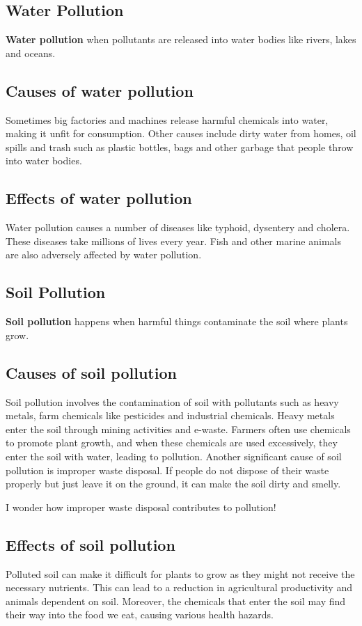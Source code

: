 \subsection{Water Pollution}
\textbf{Water pollution} when pollutants are released into water bodies like rivers, lakes and oceans.
\subsection{\textbf{Causes of water pollution}}
Sometimes big factories and machines release harmful chemicals into water, making it unfit for consumption. Other causes include dirty water from homes, oil spills and trash such as plastic bottles, bags and other garbage that people throw into water bodies.
\subsection{\textbf{Effects of water pollution}}
Water pollution causes a number of diseases like typhoid, dysentery and cholera. These diseases take millions of lives every year. Fish and other marine animals are also adversely affected by water pollution.
\subsection{Soil Pollution}
\textbf{Soil pollution} happens when harmful things contaminate the soil where plants grow.
\subsection{\textbf{Causes of soil pollution}}
Soil pollution involves the contamination of soil with pollutants such as heavy metals, farm chemicals like pesticides and industrial chemicals. Heavy metals enter the soil through mining activities and e-waste. Farmers often use chemicals to promote plant growth, and when these chemicals are used excessively, they enter the soil with water, leading to pollution. Another significant cause of soil pollution is improper waste disposal. If people do not dispose of their waste properly but just leave it on the ground, it can make the soil dirty and smelly.
\vspace{0.2in}
\par
I wonder how improper waste disposal contributes to pollution!
\subsection{\textbf{Effects of soil pollution}}
Polluted soil can make it difficult for plants to grow as they might not receive the necessary nutrients. This can lead to a reduction in agricultural productivity and animals dependent on soil. Moreover, the chemicals that enter the soil may find their way into the food we eat, causing various health hazards.
